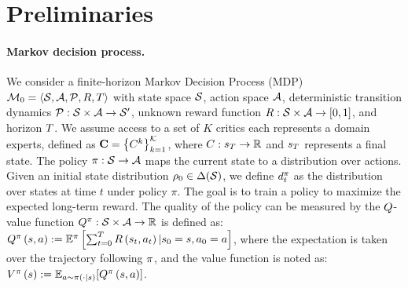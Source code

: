 \section{Preliminaries}



\paragraph{Markov decision process.} We consider a finite-horizon Markov Decision Process (MDP) $\mathcal{M}_0=\langle\mathcal{S},\mathcal{A},\mathcal{P},R, T\rangle$ with state space $\mathcal{S}$, action space $\mathcal{A}$, deterministic transition dynamics $\mathcal{P}: \mathcal{S} \times \mathcal{A} \rightarrow \mathcal{S}'$, unknown reward function $R: \mathcal{S} \times \mathcal{A} \rightarrow \left[0,1\right]$, and horizon $T$. We assume access to a set of $K$ critics each represents a domain experts, defined as 
${\mathbf{{C}}}=\left\{{C}^k\right\}_{k=1}^{\mathcal{K}}$, {where}
${C}: s_{T} \rightarrow \mathbb{R}$ {and} $s_{T}$ represents a final state. The policy $\pi:\mathcal{S} \rightarrow \mathcal{A}$ maps the current state to a distribution over actions. 
{Given an initial state distribution $\rho_0 \in \Delta(\mathcal{S})$, we define $d_t^{\pi}$ as the distribution over states at time $t$ under policy $\pi$.}
The goal is to train a policy to maximize the expected long-term reward.  The quality of the policy can be measured by the $Q$-value function $Q^{\pi}:\mathcal{S} \times \mathcal{A} \rightarrow \mathbb{R}$ is defined as:
$Q^{\pi} \left( {s,a} \right) := \mathbb{E}^{\pi}\left[\sum_{t=0}^{T}R \left( {s_t,a_t} \right) |s_0=s,a_0=a\right]$,
where the expectation is taken over the trajectory following $\pi$, and the value function is noted as:
$V^{\pi} \left( {s} \right) := \mathbb{E}_{a\sim\pi \left( {\cdot|s} \right) }\!\left[Q^{\pi} \left( {s,a} \right) \right]$.



